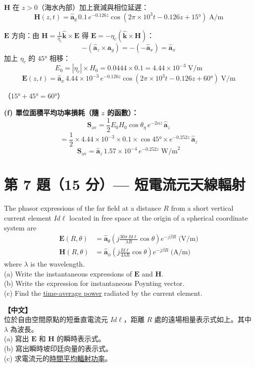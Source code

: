 \documentclass[12pt,a4paper]{article}
\newcommand{\vE}{\mathbf{E}}
\newcommand{\vH}{\mathbf{H}}
\newcommand{\vS}{\mathbf{S}}
\newcommand{\vk}{\mathbf{k}}
\newcommand{\ax}{\hat{\mathbf{a}}_x}
\newcommand{\ay}{\hat{\mathbf{a}}_y}
\newcommand{\az}{\hat{\mathbf{a}}_z}
\newcommand{\ath}{\hat{\mathbf{a}}_\theta}
\newcommand{\aph}{\hat{\mathbf{a}}_\phi}
\begin{document}
\begin{solutionbox}[詳解]
$\vH$ 在 $z>0$（海水內部）加上衰減與相位延遲：
\[
  \vH(z,t) = \ay\,0.1\,e^{-0.126z}\cos(2\pi\times10^3 t - 0.126z + 15°) \;\text{A/m}
\]

$\vE$ 方向：由 $\vH = \frac{1}{\eta_c}\hat{\vk}\times\vE$ 得 $\vE = -\eta_c(\hat{\vk}\times\vH)$：
\[
  -(\az\times\ay) = -(-\ax) = \ax
\]
加上 $\eta_c$ 的 $45°$ 相移：
\[
  E_0 = |\eta_c|\times H_0 = 0.0444\times0.1 = 4.44\times10^{-3}\;\text{V/m}
\]
\[
  \boxed{\vE(z,t) = \ax\,4.44\times10^{-3}\,e^{-0.126z}\cos(2\pi\times10^3 t - 0.126z + 60°) \;\text{V/m}}
\]

（$15° + 45° = 60°$）

\textbf{(f) 單位面積平均功率損耗（隨 $z$ 的函數）：}
\[
  \vS_{\text{av}} = \frac{1}{2}E_0 H_0\cos\theta_\eta\,e^{-2\alpha z}\,\az
\]
\[
  = \frac{1}{2}\times4.44\times10^{-3}\times0.1\times\cos45°\times e^{-0.252z}\,\az
\]
\[
  \boxed{\vS_{\text{av}} = \az\,1.57\times10^{-4}\,e^{-0.252z} \;\text{W/m}^2}
\]
\end{solutionbox}

\section{第 7 題（15 分）— 短電流元天線輻射}

\begin{questionbox}
The phasor expressions of the far field at a distance $R$ from a short vertical current element $Id\ell$ located in free space at the origin of a spherical coordinate system are
\begin{align*}
  \vE(R,\theta) &= \ath\left(j\frac{30\pi\,Id\ell}{\lambda R}\cos\theta\right)e^{-j\beta R} \;\text{(V/m)} \\[4pt]
  \vH(R,\theta) &= \aph\left(j\frac{Id\ell}{4\lambda R}\cos\theta\right)e^{-j\beta R} \;\text{(A/m)}
\end{align*}
where $\lambda$ is the wavelength.\\
(a) Write the instantaneous expressions of $\vE$ and $\vH$.\\
(b) Write the expression for instantaneous Poynting vector.\\
(c) Find the \underline{time-average power} radiated by the current element.

\medskip\noindent\textbf{【中文】}\\
位於自由空間原點的短垂直電流元 $Id\ell$，距離 $R$ 處的遠場相量表示式如上。其中 $\lambda$ 為波長。\\
(a) 寫出 $\vE$ 和 $\vH$ 的瞬時表示式。\\
(b) 寫出瞬時坡印廷向量的表示式。\\
(c) 求電流元的\underline{時間平均輻射功率}。
\end{questionbox}
\end{document}
